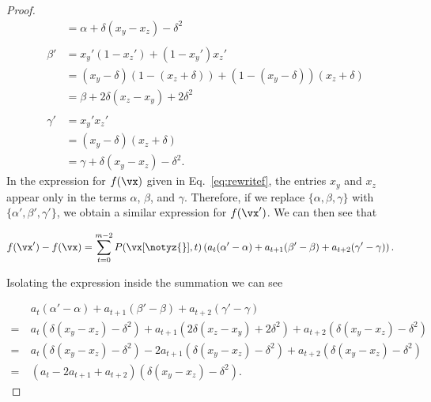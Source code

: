 \begin{proof}
\begin{equation*}
\begin{array}{llll}
			        & = \alpha + \delta(x_y-x_z) - \delta^2                            \\                                                                                                           \\
			\beta'  & = x_y' (1-x_z') + (1-x_y')x_z'                                   \\
			        & = (x_y-\delta) (1-(x_z +\delta)) + (1-(x_y-\delta))(x_z +\delta) \\
			        & = \beta + 2\delta (x_z - x_y) +2  \delta^2                       \\                                                                     \\
			\gamma' & = x_y' x_z'                                                      \\
			        & = (x_y-\delta) (x_z +\delta)                                     \\
			        & = \gamma + \delta (x_y - x_z) - \delta^2.
		\end{array}
	\end{equation*}
	In the expression for $f(\vx)$ given in Eq.~\eqref{eq:rewritef}, the entries $x_y$ and $x_z$ appear only in the terms $\alpha$, $\beta$, and $\gamma$. Therefore, if we replace $\{\alpha, \beta, \gamma\}$ with $\{\alpha', \beta', \gamma'\}$, we obtain a similar expression for $f(\vx')$. We can then see that

	\begin{align*}
		f(\vx') - f(\vx) & = \sum_{t=0}^{m-2} P(\vx[\notyz{}],t) \left( a_t (\alpha'-\alpha) +  a_{t+1}  (\beta'-\beta) +   a_{t+2}  (\gamma'-\gamma) \right).
	\end{align*}

	Isolating the expression inside the summation we can see

	\begin{align*}
		   & a_t (\alpha'-\alpha) +  a_{t+1}  (\beta'-\beta) +   a_{t+2}  (\gamma'-\gamma)                                             \\
		=~ & a_t (\delta(x_y-x_z) - \delta^2) + a_{t+1}  (2\delta (x_z - x_y) +2  \delta^2) + a_{t+2}  (\delta (x_y - x_z) - \delta^2) \\
		=~ & a_t (\delta(x_y-x_z) - \delta^2) -  2a_{t+1}  (\delta (x_y - x_z) -  \delta^2) + a_{t+2}  (\delta (x_y - x_z) - \delta^2) \\
		=~ & (a_t - 2a_{t+1} + a_{t+2}) (\delta(x_y - x_z) - \delta^2).
	\end{align*}


\end{proof}
